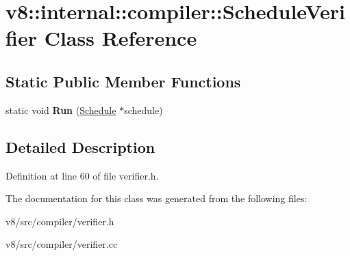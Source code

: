 \hypertarget{classv8_1_1internal_1_1compiler_1_1ScheduleVerifier}{}\section{v8\+:\+:internal\+:\+:compiler\+:\+:Schedule\+Verifier Class Reference}
\label{classv8_1_1internal_1_1compiler_1_1ScheduleVerifier}
\subsection*{Static Public Member Functions}
\begin{DoxyCompactItemize}
\item 
\mbox{\label{classv8_1_1internal_1_1compiler_1_1ScheduleVerifier_ac9dd5c8cf231784a64601369e0b3d596}} 
static void {\bfseries Run} (\mbox{\hyperlink{classv8_1_1internal_1_1compiler_1_1Schedule}{Schedule}} $\ast$schedule)
\end{DoxyCompactItemize}


\subsection{Detailed Description}


Definition at line 60 of file verifier.\+h.



The documentation for this class was generated from the following files\+:\begin{DoxyCompactItemize}
\item 
v8/src/compiler/verifier.\+h\item 
v8/src/compiler/verifier.\+cc\end{DoxyCompactItemize}
